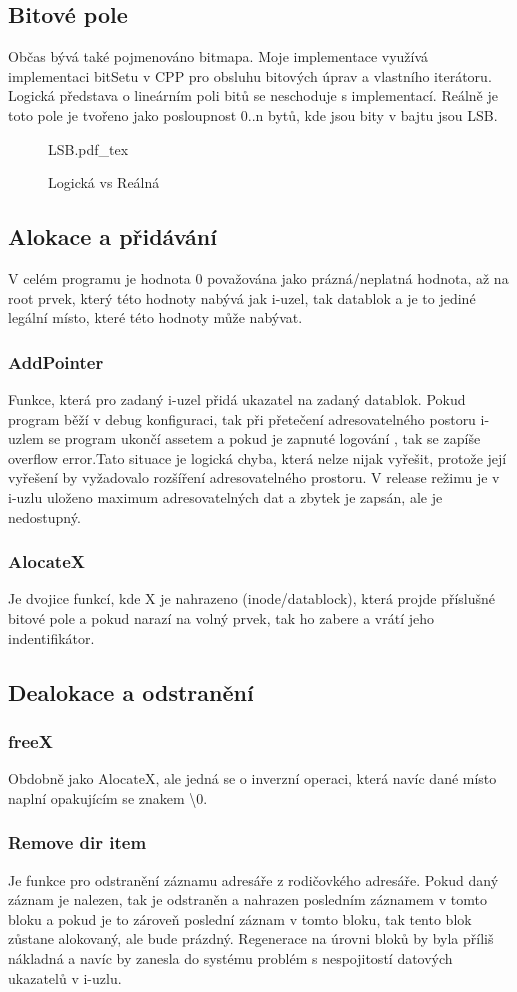 \documentclass[12pt, a4paper]{report}
\newcommand{\incfig}[1]{%
    \def\svgwidth{\columnwidth}
    {#1.pdf_tex}
}
\begin{document}
\subsection{Bitové pole}
Občas bývá také pojmenováno bitmapa. Moje implementace využívá implementaci bitSetu v CPP pro obsluhu bitových úprav a vlastního iterátoru. Logická představa o lineárním poli bitů se neschoduje s implementací. Reálně je toto pole je tvořeno jako posloupnost 0..n bytů, kde jsou bity v bajtu jsou LSB.
\begin{figure}[H]
 \centering
 \incfig{LSB}
 \caption{Logická vs Reálná}
\end{figure}
\subsection{Alokace a přidávání}
V celém programu je hodnota 0 považována jako prázná/neplatná hodnota, až na root prvek, který této hodnoty nabývá jak i-uzel, tak datablok a je to jediné legální místo, které této hodnoty může nabývat.
\subsubsection{AddPointer}
Funkce, která pro zadaný i-uzel přidá ukazatel na zadaný datablok. Pokud program běží v debug konfiguraci, tak při přetečení adresovatelného postoru i-uzlem se program ukončí  assetem a pokud je zapnuté logování , tak se zapíše overflow error.Tato situace je logická chyba, která nelze nijak vyřešit, protože její vyřešení by vyžadovalo rozšíření adresovatelného prostoru. V release režimu je v i-uzlu uloženo maximum adresovatelných dat a zbytek je zapsán, ale je nedostupný.
\subsubsection{AlocateX}
Je dvojice funkcí, kde X je nahrazeno (inode/datablock), která projde příslušné bitové pole a pokud narazí na volný prvek, tak ho zabere a vrátí jeho indentifikátor.
\subsection{Dealokace a odstranění}
\subsubsection{freeX}
Obdobně jako AlocateX, ale jedná se o inverzní operaci, která navíc dané místo naplní opakujícím se znakem \textbackslash0.
\subsubsection{Remove dir item}
Je funkce pro odstranění záznamu adresáře z rodičovkého adresáře. Pokud daný záznam je nalezen, tak je odstraněn a nahrazen posledním záznamem v tomto bloku a pokud je to zároveň poslední záznam v tomto bloku, tak tento blok zůstane alokovaný, ale bude prázdný. Regenerace na úrovni bloků by byla příliš nákladná a navíc by zanesla do systému problém s nespojitostí datových ukazatelů v i-uzlu.
\end{document}
